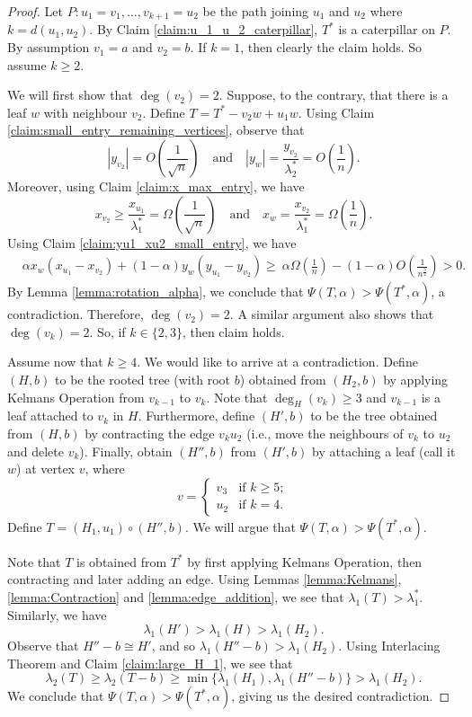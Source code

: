 \documentclass[11pt]{article}
\theoremstyle{plain}
\numberwithin{equation}{section}
\begin{document}
\begin{proof}
 Let $P: u_1=v_1, \ldots, v_{k+1}=u_2$ be the path joining $u_1$ and $u_2$ where $k=d(u_1, u_2)$. By Claim \ref{claim:u_1_u_2_caterpillar}, $T^*$ is a caterpillar on $P$. By assumption $v_1=a$ and $v_2=b$. If $k=1$, then clearly the claim holds. So assume $k\ge 2$. 
   
  We will first show that $\deg(v_2) = 2$. Suppose, to the contrary, that there is a leaf $w$ with neighbour $v_2$. Define $T=T^*-v_2w + u_1w$. Using Claim \ref{claim:small_entry_remaining_vertices}, observe that   
   \[ |y_{v_2}|= O\left(\frac{1}{\sqrt{n}}\right) \quad \text{and}\quad
   |y_w| = \frac{y_{v_2}}{\lambda_2^*} = O\left(\frac{1}{n}\right).\]
   Moreover, using Claim \ref{claim:x_max_entry}, we have 
   \[x_{v_2}\ge \frac{x_{u_1}}{\lambda_1^*}=\Omega\left(\frac{1}{\sqrt{n}}\right) \quad \text{and} \quad x_{w} = \frac{x_{v_2}}{\lambda_1^*}=\Omega\left(\frac{1}{n}\right).\]
   Using Claim \ref{claim:yu1_xu2_small_entry}, we have 
   \begin{align*}
     & \alpha x_w(x_{u_1}-x_{v_2}) + (1-\alpha)y_w(y_{u_1}-y_{v_2}) 
     \ge  \ \alpha \Omega\left(\frac{1}{n}\right) - (1-\alpha)O\left(\frac{1}{n^{\frac{3}{2}}}\right) > 0.
   \end{align*}
   By Lemma \ref{lemma:rotation_alpha}, we conclude that $\Psi(T, \alpha)>\Psi(T^*, \alpha)$, a contradiction. Therefore, $\deg(v_2)=2$. A similar argument also shows that $\deg(v_k)=2$. So, if $k\in \{2,3\}$, then claim holds. 
   
   Assume now that $k\ge 4$. We would like to arrive at a contradiction. Define $(H, b)$ to be the rooted tree (with root $b$) obtained from $(H_2, b)$ by applying Kelmans Operation from $v_{k-1}$ to $v_k$. Note that $\deg_H(v_k)\ge 3$ and $v_{k-1}$ is a leaf attached to $v_k$ in $H$. Furthermore, define $(H', b)$ to be the tree obtained from $(H, b)$ by contracting the edge $v_ku_2$ (i.e., move the neighbours of $v_k$ to $u_2$ and delete $v_k$). Finally, obtain $(H'', b)$ from $(H',b)$ by attaching a leaf (call it $w$) at vertex $v$, where 
   \[v=\begin{cases}
       v_3 & \text{if }k\ge 5;\\
       u_2 & \text{if }k=4.
   \end{cases}\]
   Define $T = (H_1, u_1)\circ (H'', b)$. We will argue that $\Psi(T, \alpha) > \Psi(T^*, \alpha)$. 

   Note that $T$ is obtained from $T^*$ by first applying Kelmans Operation, then contracting and later adding an edge. Using Lemmas \ref{lemma:Kelmans}, \ref{lemma:Contraction} and \ref{lemma:edge_addition}, we see that $\lambda_1(T)>\lambda_1^*$. Similarly, we have 
   \[ \lambda_1(H')>\lambda_1(H)>\lambda_1(H_2).\]
   Observe that $H''-b\cong H'$, and so $\lambda_1(H''-b)>\lambda_1(H_2)$. Using Interlacing Theorem and Claim \ref{claim:large_H_1}, we see that 
   \[\lambda_2(T) \ge \lambda_2(T-b)\ge \min\{\lambda_1(H_1), \lambda_1(H''-b)\} > \lambda_1(H_2).\]
   We conclude that $\Psi(T, \alpha)> \Psi(T^*, \alpha)$, giving us the desired contradiction.
\end{proof}
\end{document}
